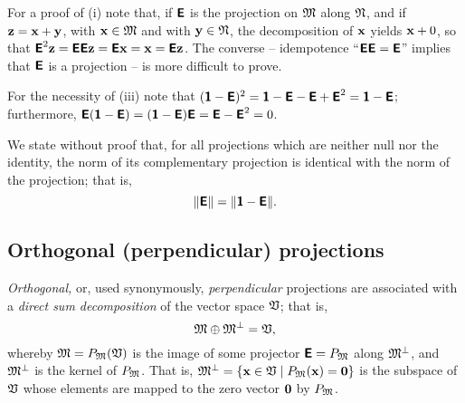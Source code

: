 {\color{OliveGreen}
\bproof
For a proof of (i) note that, if $\textsf{\textbf{E}}$  is the projection
on ${\frak M}$
along ${\frak N}$,
and if
$
{\bf z}
=
{\bf x}
+
{\bf y}
$, with
${\bf x} \in {\frak M}$
and with
${\bf y} \in {\frak N}$,
the decomposition of ${\bf x}$ yields
${\bf x}+0$, so that
$\textsf{\textbf{E}}^2{\bf z}=\textsf{\textbf{E}}\textsf{\textbf{E}}{\bf z}=\textsf{\textbf{E}}{\bf x}
={\bf x}=\textsf{\textbf{E}}{\bf z}$.
The converse --
idempotence
``$\textsf{\textbf{E}}\textsf{\textbf{E}}=\textsf{\textbf{E}}$''
implies that $\textsf{\textbf{E}}$ is a projection -- is more difficult to prove.


For the necessity of (iii) note that $(\textsf{\textbf{1}}-\textsf{\textbf{E}})^2
=\textsf{\textbf{1}}-\textsf{\textbf{E}}-\textsf{\textbf{E}}+ \textsf{\textbf{E}}^2
=\textsf{\textbf{1}}-\textsf{\textbf{E}}$;
furthermore,
$
\textsf{\textbf{E}}(\textsf{\textbf{1}}-\textsf{\textbf{E}})=
(\textsf{\textbf{1}}-\textsf{\textbf{E}})\textsf{\textbf{E}}=
\textsf{\textbf{E}}- \textsf{\textbf{E}}^2=0
$.

\eproof
}



We state without proof\cite{Szyld2006} that, for all projections
which are neither null nor the identity,
the norm of its complementary projection
is identical with the norm of the projection; that is,
\begin{equation}
\| \textsf{\textbf{E}} \| = \| \textsf{\textbf{1}} - \textsf{\textbf{E}} \|
.
\end{equation}








\subsection{Orthogonal (perpendicular) projections}

{\em Orthogonal,} or, used synonymously,
{\em perpendicular} projections
are associated with a {\em direct sum decomposition} of the vector space ${\frak V}$;
that is,
\begin{equation}
 {\frak M}\oplus {\frak M}^\perp ={\frak V},
\label{2012-m-ch-fdvs-perp}
\end{equation}
whereby $ {\frak M}= P_{\frak M}({\frak V})$
is the image of some projector $\textsf{\textbf{E}}=P_{\frak M}$
along ${\frak M}^\perp$, and  ${\frak M}^\perp$ is
the kernel of $P_{\frak M}$.
That is, ${\frak M}^\perp = \left\{{\bf x} \in {\frak V} \mid P_{\frak M}({\bf x}) = {\bf 0}\right\}$
is the subspace of ${\frak V}$
whose elements are mapped to the zero vector ${\bf 0}$ by $P_{\frak M}$.


